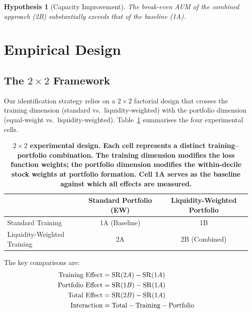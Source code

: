 \documentclass[a4paper,12pt,final]{article}
\newtheorem{hypothesis}{Hypothesis}
\begin{document}
\begin{hypothesis}[Capacity Improvement]
\label{hyp:h4}
The break-even AUM of the combined approach (2B) substantially exceeds that of the baseline (1A).
\end{hypothesis}


\section{Empirical Design}
\label{sec:design}

\subsection{The $2 \times 2$ Framework}
\label{subsec:two_by_two}

Our identification strategy relies on a $2 \times 2$ factorial design that crosses the training dimension (standard vs.\ liquidity-weighted) with the portfolio dimension (equal-weight vs.\ liquidity-weighted). Table~\ref{tab:two_by_two} summarises the four experimental cells.

\begin{table}[t!]
\centering
\begin{tabular}{l cc}
\midrule
 & Standard Portfolio (EW) & Liquidity-Weighted Portfolio \\
\midrule
Standard Training & 1A (Baseline) & 1B \\
Liquidity-Weighted Training & 2A & 2B (Combined) \\
\midrule
\end{tabular}
\caption{\footnotesize \bf $2\times 2$ experimental design\normalfont. Each cell represents a distinct training--portfolio combination. The training dimension modifies the loss function weights; the portfolio dimension modifies the within-decile stock weights at portfolio formation. Cell 1A serves as the baseline against which all effects are measured.}
\label{tab:two_by_two}
\end{table}

The key comparisons are:
\begin{align}
\text{Training Effect} &= \mathrm{SR}(2A) - \mathrm{SR}(1A) \label{eq:training_effect} \\
\text{Portfolio Effect} &= \mathrm{SR}(1B) - \mathrm{SR}(1A) \label{eq:portfolio_effect} \\
\text{Total Effect} &= \mathrm{SR}(2B) - \mathrm{SR}(1A) \label{eq:total_effect} \\
\text{Interaction} &= \text{Total} - \text{Training} - \text{Portfolio} \label{eq:interaction}
\end{align}
\end{document}
